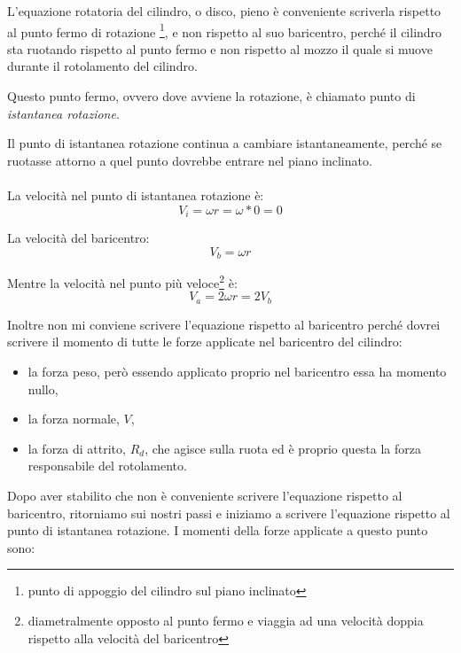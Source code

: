 L'equazione rotatoria del cilindro, o disco, pieno è conveniente scriverla rispetto al punto fermo di rotazione \footnote{punto di appoggio del cilindro sul piano inclinato}, e non rispetto al suo baricentro, perché il cilindro sta ruotando rispetto al punto fermo e non rispetto al mozzo il quale si muove durante il rotolamento del cilindro.

Questo punto fermo, ovvero dove avviene la rotazione, è chiamato punto di \textit{istantanea rotazione}.

Il punto di istantanea rotazione continua a cambiare istantaneamente, perché se ruotasse attorno a quel punto dovrebbe entrare nel piano inclinato.

\paragraph{}
La velocità nel punto di istantanea rotazione è:
\begin{equation*}
    V_i = \omega r = \omega * 0  = 0
\end{equation*}

La velocità del baricentro:
\begin{equation*}
    V_b = \omega r
\end{equation*}

Mentre la velocità nel punto più veloce\footnote{diametralmente opposto al punto fermo e viaggia ad una velocità doppia rispetto alla velocità del baricentro} è:
\begin{equation*}
    V_a = 2\omega r = 2V_b
\end{equation*}

Inoltre non mi conviene scrivere l'equazione rispetto al baricentro perché dovrei scrivere il momento di tutte le forze applicate nel baricentro del cilindro: 

\begin{itemize}
    \item la forza peso, però essendo applicato proprio nel baricentro essa ha momento nullo,
    \item la forza normale, $V$,
    \item la forza di attrito, $R_d$,  che agisce sulla ruota ed è proprio questa la forza responsabile del rotolamento.
\end{itemize}

Dopo aver stabilito che non è conveniente scrivere l'equazione rispetto al baricentro, ritorniamo sui nostri passi e iniziamo a scrivere l'equazione rispetto al punto di istantanea rotazione.
I momenti della forze applicate a questo punto sono: 

